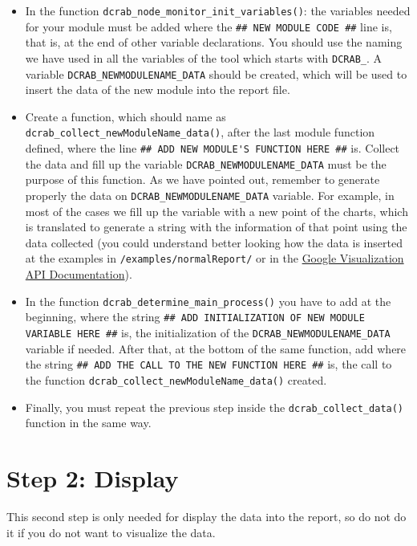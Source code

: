 \documentclass[10pt,a4paper]{report}
\begin{document}
\begin{itemize}
  \item In the function \texttt{dcrab\_node\_monitor\_init\_variables()}: the variables needed for your module must be added where the \verb+## NEW MODULE CODE ##+ line is, that is, at the end of other variable declarations. You should use the naming we have used in all the variables of the tool which starts with \verb+DCRAB_+. A variable \verb+DCRAB_NEWMODULENAME_DATA+ should be created, which will be used to insert the data of the new module into the report file.
  \item Create a function, which should name as \texttt{dcrab\_collect\_newModuleName\_data()}, after the last module function defined, where the line \verb+## ADD NEW MODULE'S FUNCTION HERE ##+ is. Collect the data and fill up the variable \verb+DCRAB_NEWMODULENAME_DATA+ must be the purpose of this function. As we have pointed out, remember to generate properly the data on \verb+DCRAB_NEWMODULENAME_DATA+ variable. For example, in most of the cases we fill up the variable with a new point of the charts, which is translated to generate a string with the information of that point using the data collected (you could understand better looking how the data is inserted at the examples in \verb+/examples/normalReport/+ or in the \href{https://developers.google.com/chart/interactive/docs/reference}{Google Visualization API Documentation}).
  \item In the function \texttt{dcrab\_determine\_main\_process()} you have to add at the beginning, where the string \verb+## ADD INITIALIZATION OF NEW MODULE VARIABLE HERE ##+ is, the initialization of the \verb+DCRAB_NEWMODULENAME_DATA+ variable if needed. After that, at the bottom of the same function, add where the string \verb+## ADD THE CALL TO THE NEW FUNCTION HERE ##+ is, the call to the function \texttt{dcrab\_collect\_newModuleName\_data()} created.
  \item Finally, you must repeat the previous step inside the \texttt{dcrab\_collect\_data()} function in the same way.
\end{itemize}

\section{Step 2: Display}

This second step is only needed for display the data into the report, so do not do it if you do not want to visualize the data.
\end{document}

